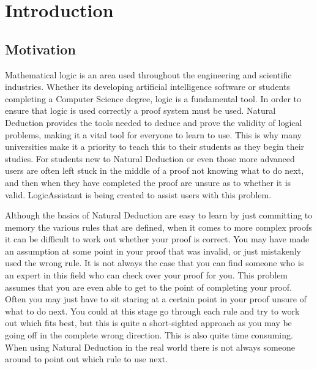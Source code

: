 

\newcommand{\reporttitle}{LogicAssistant}
\newcommand{\reportauthor}{Joshua Zeltser}
\newcommand{\supervisor}{Romain Barnoud}
\newcommand{\degreetype}{Computing}






\date{September 2015}






\pagebreak
\tableofcontents
\pagebreak

\section{Introduction}

\subsection{Motivation}

Mathematical logic is an area used throughout the engineering and scientific industries. Whether its developing artificial intelligence software or students completing a Computer Science degree, logic is a fundamental tool. In order to ensure that logic is used correctly a proof system must be used. Natural Deduction provides the tools needed to deduce and prove the validity of logical problems, making it a vital tool for everyone to learn to use. This is why many universities make it a priority to teach this to their students as they begin their studies. For students new to Natural Deduction or even those more advanced users are often left stuck in the middle of a proof not knowing what to do next, and then when they have completed the proof are unsure as to whether it is valid. LogicAssistant is being created to assist users with this problem.

Although the basics of Natural Deduction are easy to learn by just committing to memory the various rules that are defined, when it comes to more complex proofs it can be difficult to work out whether your proof is correct. You may have made an assumption at some point in your proof that was invalid, or just mistakenly used the wrong rule. It is not always the case that you can find someone who is an expert in this field who can check over your proof for you. This problem assumes that you are even able to get to the point of completing your proof. Often you may just have to sit staring at a certain point in your proof unsure of what to do next. You could at this stage go through each rule and try to work out which fits best, but this is quite a short-sighted approach as you may be going off in the complete wrong direction. This is also quite time consuming. When using Natural Deduction in the real world there is not always someone around to point out which rule to use next. 

